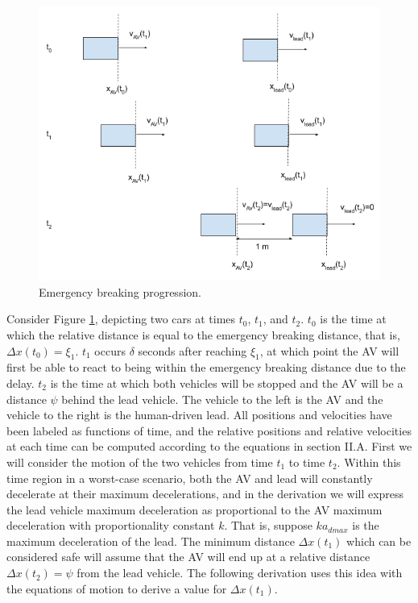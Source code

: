 \documentclass[conference]{IEEEtran}
\begin{document}
\begin{appendix}
\begin{figure}[htbp]
\centerline{\includegraphics[width=6 in]{xiDerivation.png}}
\caption{Emergency breaking progression.}
\label{fig2}
\end{figure}

Consider Figure \ref{fig2}, depicting two cars at times $t_0$, $t_1$, and $t_2$. $t_0$ is the time at which the relative distance is equal to the emergency breaking distance, that is, $\Delta x(t_0)=\xi_1$. $t_1$ occurs $\delta$ seconds after reaching $\xi_1$, at which point the AV will first be able to react to being within the emergency breaking distance due to the delay. $t_2$ is the time at which both vehicles will be stopped and the AV will be a distance $\psi$ behind the lead vehicle. The vehicle to the left is the AV and the vehicle to the right is the human-driven lead. All positions and velocities have been labeled as functions of time, and the relative positions and relative velocities at each time can be computed according to the equations in section II.A. First we will consider the motion of the two vehicles from time $t_1$ to time $t_2$. Within this time region in a worst-case scenario, both the AV and lead will constantly decelerate at their maximum decelerations, and in the derivation we will express the lead vehicle maximum deceleration as proportional to the AV maximum deceleration with proportionality constant $k$. That is, suppose $ka_{dmax}$ is the maximum deceleration of the lead. The minimum distance $\Delta x(t_1)$ which can be considered safe will assume that the AV will end up at a relative distance $\Delta x(t_2)= \psi$ from the lead vehicle. The following derivation uses this idea with the equations of motion to derive a value for $\Delta x(t_1)$.


\end{appendix}
\end{document}
